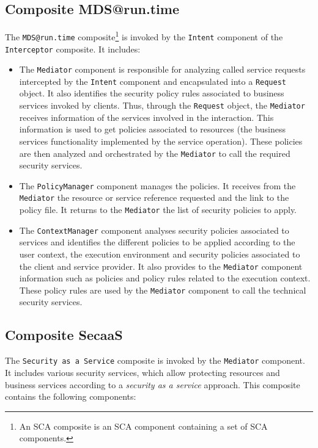 \documentclass[runningheads,a4paper]{llncs}
\begin{document}
\subsection{Composite MDS@run.time}
The \texttt{MDS@run.time} composite\footnote{An SCA composite is an SCA component containing a set of SCA components.} is invoked by the \texttt{Intent} component of the \texttt{Inter\-ceptor} composite. It includes:

\begin{itemize}
\settowidth{\leftmargin}{{\Large$\square$}}\advance\leftmargin{}
\itemsep8pt\relax
\renewcommand\labelitemi{{\lower1.5pt\hbox{\Large$\square$}}}

\item The \texttt{Mediator} component is responsible for analyzing called service requests intercepted by the \texttt{Intent} component and  encapsulated into a \texttt{Request} object. It also identifies the security policy rules associated to business services invoked by clients. Thus, through the \texttt{Request} object, the \texttt{Mediator} receives information of the services involved in the interaction. This information is used to get policies associated to resources (the business services functionality implemented by the service operation). These policies are then analyzed and orchestrated by the \texttt{Mediator} to call the required security services.
\item The \texttt{PolicyManager} component manages the policies. It receives from the \texttt{Mediator} the resource or service reference requested and the link to the policy file. It returns to the \texttt{Mediator} the list of security policies to apply.
\item The \texttt{ContextManager} component analyses security policies associated to services and identifies the different policies to be applied according to the user context, the execution environment and security policies associated to the client and service provider. It also provides to the \texttt{Mediator} component information such as policies and policy rules related to the execution context. These policy rules are used by the \texttt{Mediator} component to call the technical security services.
\end{itemize}


\subsection{Composite SecaaS}

The \texttt{Security as a Service} composite is invoked by the \texttt{Mediator} component. It includes various security services, which allow protecting resources and business services according to a \textit{security as a service} approach. This composite contains the following components:
\end{document}
